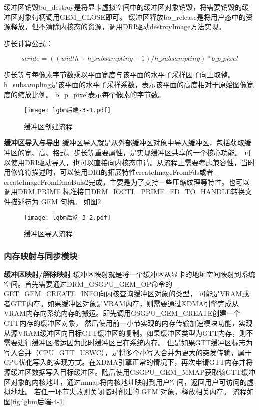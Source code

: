 缓冲区销毁bo\_destroy是将显卡虚拟空间中的缓冲区对象销毁，将需要销毁的缓冲区对象句柄调用GEM\_CLOSE即可。
缓冲区释放bo\_release是将用户态中的资源释放，但不清除内核态的资源，调用DRI驱动destroyImage方法实现。

步长计算公式：

\begin{equation}
  stride=((width+h\_subsampling-1)/h\_subsampling)*b\_p\_pixel
\end{equation}

步长等与每像素字节数乘以平面宽度与该平面的水平子采样因子向上取整。h\_subsampling是该平面的水平子采样系数，表示该平面的高度相对于原始图像宽度的缩放比例。
b\_p\_pixel表示每个像素的字节数。

\begin{figure}[h]
  \centering
  \texttt{[image: lgbm后端-3-1.pdf]}
  \caption{缓冲区创建流程}
  \label{fig:lgbm后端-3-1}
\end{figure}  

\textbf{缓冲区导入与导出}
缓冲区导入就是从外部缓冲区对象中导入缓冲区，包括获取缓冲区的宽、高、格式、步长等重要属性，是实现缓冲区共享的一个核心功能。
可以使用DRI驱动导入，也可以直接向内核态申请。从流程上需要考虑兼容性，当时用修饰符描述时，可以使用DRI的拓展特性createImageFromFds或者
createImageFromDmaBufs2完成，主要是为了支持一些压缩纹理等特性。也可以调用​DRM PRIME 标准接口​DRM\_IOCTL\_PRIME\_FD\_TO\_HANDLE转换文件描述符为 GEM 句柄。
如图\ref{fig:lgbm后端-3-2}

\begin{figure}[h]
  \centering
  \texttt{[image: lgbm后端-3-2.pdf]}
  \caption{缓冲区导入流程}
  \label{fig:lgbm后端-3-2}
\end{figure}  

\subsubsection{内存映射与同步模块}

\textbf{缓冲区映射/解除映射}
缓冲区映射就是将一个缓冲区从显卡的地址空间映射到系统空间。首先需要通过DRM\_GSGPU\_GEM\_OP命令的GET\_GEM\_CREATE\_INFO向内核查询缓冲区对象的类型，
可能是VRAM或者GTT内存。如果缓冲区对象是VRAM内存，则需要通过XDMA引擎完成从VRAM内存向系统内存的搬运。即先调用GSGPU\_GEM\_CREATE创建一个GTT内存的缓冲区对象，
然后使用前一小节实现的内存传输加速模块功能，实现从源VRAM缓冲区向目标GTT缓冲区的复制。如果缓冲区类型为GTT内存，则不需要进行缓冲区搬运因为此时缓冲区已在系统内存。
但是如果GTT缓冲区标志为写入合并（CPU\_GTT\_USWC），是将多个小写入合并为更大的突发传输，属于CPU优化写入的实现方式。在XDMA引擎正常的情况下，再次申请GTT内存并将
源缓冲区数据写入目标缓冲区。随后使用GSGPU\_GEM\_MMAP获取该GTT缓冲区对象的内核地址，通过mmap将内核地址映射到用户空间，返回用户可访问的虚拟地址。
若任一环节失败则关闭临时创建的 GEM 对象，释放相关内存。
流程如图\ref{fig:lgbm后端-4-1}

